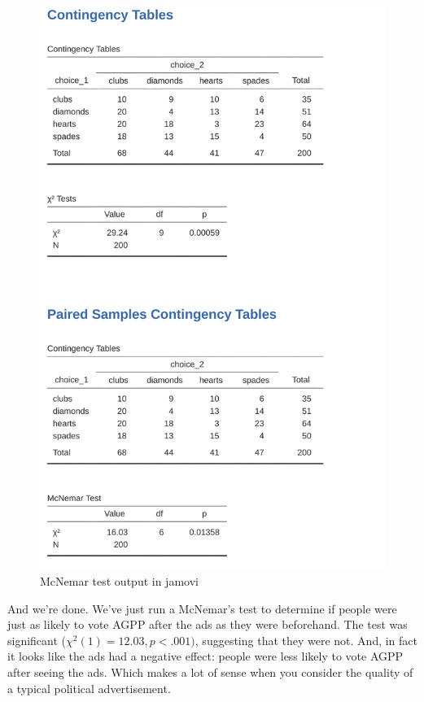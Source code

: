 \documentclass[
  a4paper,
]{book}
\begin{document}
\begin{figure}

\includegraphics[width=1\textwidth,height=\textheight]{images/fig10-8.png} \hfill{}

\caption{\label{fig-fig10-8}McNemar test output in jamovi}

\end{figure}

And we're done. We've just run a McNemar's test to determine if people
were just as likely to vote AGPP after the ads as they were beforehand.
The test was significant (\(\chi^2(1)= 12.03, p< .001)\), suggesting
that they were not. And, in fact it looks like the ads had a negative
effect: people were less likely to vote AGPP after seeing the ads. Which
makes a lot of sense when you consider the quality of a typical
political advertisement.
\end{document}

